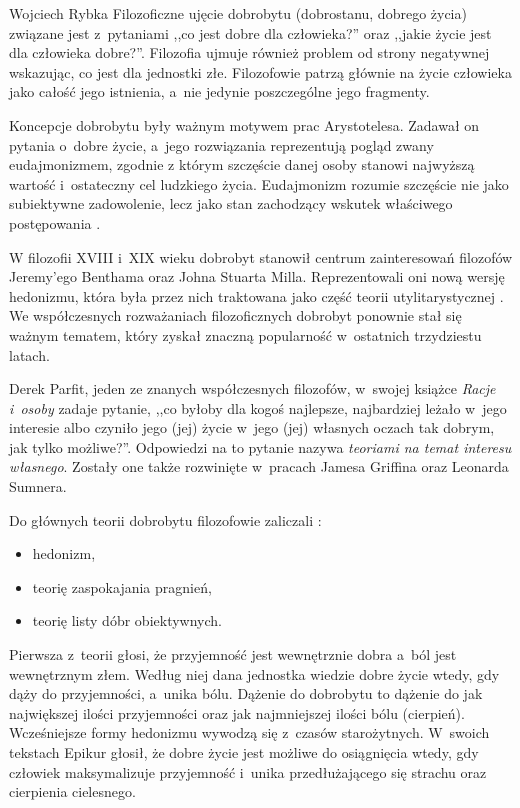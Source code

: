 \begin{artplenv}{Wojciech Rybka}
Filozoficzne ujęcie dobrobytu (dobrostanu, dobrego życia) związane jest z~pytaniami ,,co jest dobre dla człowieka?'' oraz
,,jakie życie jest dla człowieka dobre?''. Filozofia ujmuje również problem od strony negatywnej wskazując, co jest dla
jednostki złe. Filozofowie patrzą głównie na życie człowieka jako całość jego istnienia, a~nie jedynie poszczególne
jego fragmenty. 

Koncepcje dobrobytu były ważnym motywem prac Arystotelesa. Zadawał on pytania o~dobre życie,
a~jego rozwiązania reprezentują pogląd zwany eudajmonizmem,
zgodnie z którym szczęście danej osoby stanowi najwyższą wartość i~ostateczny cel ludzkiego
życia. Eudajmonizm rozumie szczęście nie jako subiektywne zadowolenie, lecz jako stan zachodzący wskutek właściwego
postępowania
\parencite{moleda_kantowska_2009}.

W filozofii XVIII i~XIX wieku dobrobyt stanowił centrum zainteresowań filozofów Jeremy'ego Benthama oraz Johna Stuarta
Milla. Reprezentowali oni nową wersję hedonizmu, która była przez nich traktowana jako część teorii utylitarystycznej
\parencite{brey_well-being_2012}.
We współczesnych rozważaniach filozoficznych dobrobyt ponownie stał się ważnym
tematem, który zyskał znaczną popularność w~ostatnich trzydziestu latach.

Derek Parfit, jeden ze znanych współczesnych filozofów, w~swojej książce \textit{Racje i~osoby}
\parencite*{parfit_racje_2012}
zadaje pytanie, ,,co byłoby dla kogoś najlepsze, najbardziej leżało w~jego interesie
albo czyniło jego (jej) życie w~jego (jej) własnych oczach tak dobrym, jak tylko możliwe?''. Odpowiedzi na to pytanie
nazywa \textit{teoriami na temat interesu własnego}. Zostały one także rozwinięte w~pracach Jamesa Griffina oraz
Leonarda Sumnera. 

Do głównych teorii dobrobytu filozofowie zaliczali
\parencite{brey_well-being_2012}:

\begin{itemize}
\item hedonizm,
\item teorię zaspokajania pragnień,
\item teorię listy dóbr obiektywnych.
\end{itemize}

Pierwsza z~teorii głosi, że przyjemność jest wewnętrznie dobra a~ból jest wewnętrznym złem. Według niej dana jednostka
wiedzie dobre życie wtedy, gdy dąży do przyjemności, a~unika bólu. Dążenie do dobrobytu to dążenie do jak największej
ilości przyjemności oraz jak najmniejszej ilości bólu (cierpień). Wcześniejsze formy hedonizmu wywodzą się z~czasów
starożytnych. W~swoich tekstach Epikur głosił, że dobre życie jest możliwe do osiągnięcia wtedy, gdy człowiek
maksymalizuje przyjemność i~unika przedłużającego się strachu oraz cierpienia cielesnego. 


\end{artplenv}

